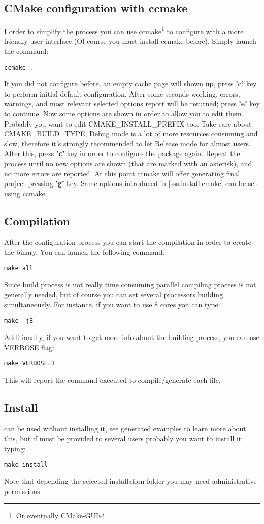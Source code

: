 \subsection{CMake configuration with ccmake}
%
I order to simplify the process you can use ccmake\footnote{Or eventually 
CMake-GUI} to configure \NAME with a more friendly user interface (Of course 
you must install ccmake before). Simply launch the command:
%
\begin{verbatim}
ccmake .
\end{verbatim}
%
If you did not configure \NAME before, an empty cache page will shown up, press
\textbf{'c'} key to perform initial default configuration. After some seconds 
working, errors, warnings, and most relevant selected options report will be 
returned; press \textbf{'e'} key to continue.\rc
%
Now some options are shown in order to allow you to edit them.
%
Probably you want to edit CMAKE\_INSTALL\_PREFIX too. Take care about
CMAKE\_BUILD\_TYPE, Debug mode is a lot of more resources consuming and slow, 
therefore it's strongly recommended to let Release mode for almost users.\rc
%
After this, press \textbf{'c'} key in order to configure the package again. 
Repeat the process until no new options are shown (that are marked with an 
asterisk), and no more errors are reported.
%
At this point ccmake will offer generating final project pressing \textbf{'g'} 
key.\rc
%
Same options introduced in \ref{sss:install:cmake} can be set using ccmake.
%
\subsection{Compilation}
%
After the configuration process you can start the compilation in order to 
create the binary.
%
You can launch the following command:
%
\begin{verbatim}
make all
\end{verbatim}
%
Since \NAME build process is not really time consuming parallel compiling 
process is not generally needed, but of course you can set several processors 
building simultaneously.
%
For instance, if you want to use 8 cores you can type:
%
\begin{verbatim}
make -j8
\end{verbatim}
%
Additionally, if you want to get more info about the building process, you can 
use VERBOSE flag:
%
\begin{verbatim}
make VERBOSE=1
\end{verbatim}
%
This will report the command executed to compile/generate each file.
%
\subsection{Install}
%
\NAME can be used without installing it, see generated examples to learn more 
about this, but if \NAME must be provided to several users probably you want 
to install it typing:
%
\begin{verbatim}
make install
\end{verbatim}
%
Note that depending the selected installation folder you may need administrative permissions.
%